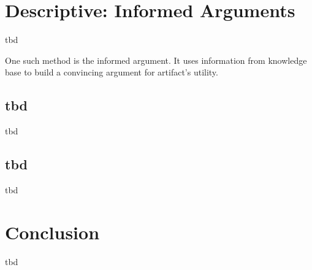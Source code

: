 \section{Descriptive: Informed Arguments}

tbd



One such method is the informed argument. It uses information from knowledge base to build a convincing argument for artifact’s utility.
\cite{Hevner2010}



\subsection{tbd}

tbd





\subsection{tbd}

tbd





\section{Conclusion}

tbd





